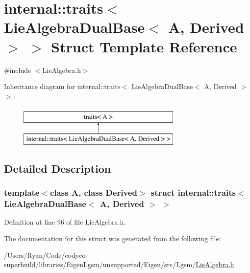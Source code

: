 \hypertarget{structinternal_1_1traits_3_01_lie_algebra_dual_base_3_01_a_00_01_derived_01_4_01_4}{}\section{internal\+:\+:traits$<$ Lie\+Algebra\+Dual\+Base$<$ A, Derived $>$ $>$ Struct Template Reference}
\label{structinternal_1_1traits_3_01_lie_algebra_dual_base_3_01_a_00_01_derived_01_4_01_4}


{\ttfamily \#include $<$Lie\+Algebra.\+h$>$}

Inheritance diagram for internal\+:\+:traits$<$ Lie\+Algebra\+Dual\+Base$<$ A, Derived $>$ $>$\+:\begin{figure}[H]
\begin{center}
\leavevmode
\includegraphics[height=2.000000cm]{structinternal_1_1traits_3_01_lie_algebra_dual_base_3_01_a_00_01_derived_01_4_01_4}
\end{center}
\end{figure}


\subsection{Detailed Description}
\subsubsection*{template$<$class A, class Derived$>$\newline
struct internal\+::traits$<$ Lie\+Algebra\+Dual\+Base$<$ A, Derived $>$ $>$}



Definition at line 96 of file Lie\+Algebra.\+h.



The documentation for this struct was generated from the following file\+:\begin{DoxyCompactItemize}
\item 
/\+Users/\+Ryan/\+Code/codyco-\/superbuild/libraries/\+Eigen\+Lgsm/unsupported/\+Eigen/src/\+Lgsm/\hyperlink{_lie_algebra_8h}{Lie\+Algebra.\+h}\end{DoxyCompactItemize}
